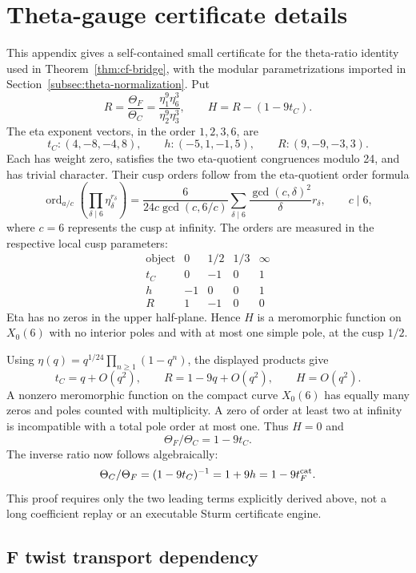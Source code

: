 \documentclass[11pt,a4paper]{article}
\begin{document}
\appendix

\section{Theta-gauge certificate details}
\label{app:certificate}

This appendix gives a self-contained small certificate for the theta-ratio
identity used in Theorem~\ref{thm:cf-bridge}, with the modular
parametrizations imported in Section~\ref{subsec:theta-normalization}.
Put
\[
 R=\frac{\Theta_F}{\Theta_C}
   =\frac{\eta_1^9\eta_6^3}{\eta_2^9\eta_3^3},
 \qquad H=R-(1-9t_C).
\]
The eta exponent vectors, in the order $1,2,3,6$, are
\[
 t_C:(4,-8,-4,8),\qquad h:(-5,1,-1,5),\qquad R:(9,-9,-3,3).
\]
Each has weight zero, satisfies the two eta-quotient congruences modulo 24,
and has trivial character.  Their cusp orders follow from the eta-quotient
order formula
\[
 \operatorname{ord}_{a/c}\!\left(\prod_{\delta\mid6}\eta_\delta^{r_\delta}\right)
 =\frac{6}{24c\gcd(c,6/c)}
   \sum_{\delta\mid6}\frac{\gcd(c,\delta)^2}{\delta}r_\delta,
 \qquad c\mid6,
\]
where $c=6$ represents the cusp at infinity.  The orders are measured in
the respective local cusp parameters:
\[
\begin{array}{c|rrrr}
\text{object}&0&1/2&1/3&\infty\\
\hline
t_C&0&-1&0&1\\
h&-1&0&0&1\\
R&1&-1&0&0
\end{array}
\]
Eta has no zeros in the upper half-plane.  Hence $H$ is a meromorphic
function on $X_0(6)$ with no interior poles and with at most one simple
pole, at the cusp $1/2$.

Using $\eta(q)=q^{1/24}\prod_{n\ge1}(1-q^n)$, the displayed products give
\[
 t_C=q+O(q^2),\qquad R=1-9q+O(q^2),\qquad H=O(q^2).
\]
A nonzero meromorphic function on the compact curve $X_0(6)$ has equally
many zeros and poles counted with multiplicity.  A zero of order at least
two at infinity is incompatible with a total pole order at most one.
Thus $H=0$ and
\[
 \Theta_F/\Theta_C=1-9t_C.
\]
The inverse ratio now follows algebraically:
\[
 \Theta_C/\Theta_F=(1-9t_C)^{-1}
  =1+9h=1-9t_F^{\rm cat}.
\]
This proof requires only the two leading terms explicitly derived above,
not a long coefficient replay or an executable Sturm certificate engine.

\subsection{F twist transport dependency}
\end{document}

